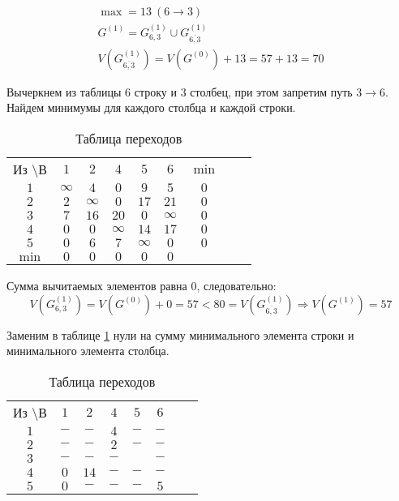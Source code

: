 \begin{gather*}
\max = 13\ (6 \rightarrow 3) \\
G^{(1)} = G_{6,3}^{(1)} \cup G_{\overline{6,3}}^{(1)} \\
V(G_{\overline{6,3}}^{(1)}) = V(G^{(0)}) + 13 = 57 + 13 = 70
\end{gather*}

Вычеркнем из таблицы $6$ строку и $3$ столбец, при этом запретим путь $3 \rightarrow 6$. Найдем минимумы для каждого столбца и каждой строки.

\begin{table}[H]
\begin{center}
	\def\tabcolsep{15pt}
	\caption{Таблица переходов}
	\label{tab:10}
	\begin{tabular}{|c||c|c|c|c|c|c|c|c|}
		\hline
		Из \textbackslash В & $1$ & $2$ & $4$ & $5$ & $6$ & $\min$ \\
		\hhline{|=#=|=|=|=|=|=|}
		$1$ & $\infty$ & $4$ & $0$ & $9$ & $5$ & $0$ \\
		\hline
		$2$ & $2$ & $\infty$ & $0$ & $17$ & $21$ & $0$ \\
		\hline
		$3$ & $7$ & $16$ & $20$ & $0$ & $\infty$ & $0$ \\ 
		\hline
		$4$ & $0$ & $0$ & $\infty$ & $14$ & $17$ & $0$ \\
		\hline
		$5$ & $0$ & $6$ & $7$ & $\infty$ & $0$ & $0$ \\
		\hhline{|=#=|=|=|=|=|=|} 
		$\min$ & $0$ & $0$ & $0$ & $0$ & $0$ & \\ 
		\hline
	\end{tabular}
\end{center}
\end{table}

Сумма вычитаемых элементов равна $0$, следовательно:
\begin{equation*}
V(G_{6,3}^{(1)}) = V(G^{(0)}) + 0 = 57 < 80 = V(G_{\overline{6,3}}^{(1)}) \Rightarrow V(G^{(1)}) = 57
\end{equation*}

Заменим в таблице \ref{tab:10} нули на сумму минимального элемента строки и минимального элемента столбца.

\begin{table}[H]
\begin{center}
	\def\tabcolsep{15pt}
	\caption{Таблица переходов}
	\label{tab:11}
	\begin{tabular}{|c||c|c|c|c|c|c|c|}
		\hline
		Из \textbackslash В & $1$ & $2$ & $4$ & $5$ & $6$ \\
		\hhline{|=#=|=|=|=|=|}
		$1$ & $-$ & $-$ & $4$ & $-$ & $-$ \\
		\hline
		$2$ & $-$ & $-$ & $2$ & $-$ & $-$ \\
		\hline
		$3$ & $-$ & $-$ & $-$ & \redbold{$16$} & $-$ \\ 
		\hline
		$4$ & $0$ & $14$ & $-$ & $-$ & $-$ \\
		\hline
		$5$ & $0$ & $-$ & $-$ & $-$ & $5$ \\
		\hline
	\end{tabular}
\end{center}
\end{table}

